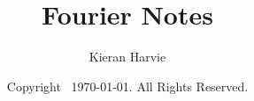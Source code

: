 \documentclass[12pt]{report}
\title{Fourier Notes}
\date{Copyright \textcopyright\, \today. All Rights Reserved.}
\author{Kieran Harvie}
\begin{document}
\maketitle






\renewcommand{\thechapter}{A}

\end{document}
